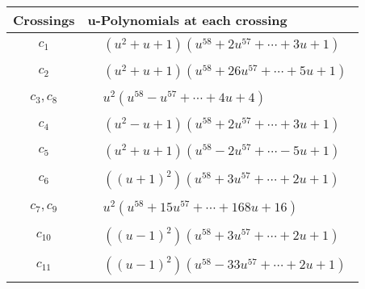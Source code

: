 \documentclass[1p]{elsarticle_modified}
\theoremstyle{definition}
\begin{document}
\begin{tabular}{m{50pt}|m{274pt}}
Crossings & \hspace{64pt}u-Polynomials at each crossing \\
\hline $$\begin{aligned}c_{1}\end{aligned}$$&$\begin{aligned}
&(u^2+u+1)(u^{58}+2 u^{57}+\cdots+3 u+1)
\end{aligned}$\\
\hline $$\begin{aligned}c_{2}\end{aligned}$$&$\begin{aligned}
&(u^2+u+1)(u^{58}+26 u^{57}+\cdots+5 u+1)
\end{aligned}$\\
\hline $$\begin{aligned}c_{3},c_{8}\end{aligned}$$&$\begin{aligned}
&u^2(u^{58}- u^{57}+\cdots+4 u+4)
\end{aligned}$\\
\hline $$\begin{aligned}c_{4}\end{aligned}$$&$\begin{aligned}
&(u^2- u+1)(u^{58}+2 u^{57}+\cdots+3 u+1)
\end{aligned}$\\
\hline $$\begin{aligned}c_{5}\end{aligned}$$&$\begin{aligned}
&(u^2+u+1)(u^{58}-2 u^{57}+\cdots-5 u+1)
\end{aligned}$\\
\hline $$\begin{aligned}c_{6}\end{aligned}$$&$\begin{aligned}
&((u+1)^2)(u^{58}+3 u^{57}+\cdots+2 u+1)
\end{aligned}$\\
\hline $$\begin{aligned}c_{7},c_{9}\end{aligned}$$&$\begin{aligned}
&u^2(u^{58}+15 u^{57}+\cdots+168 u+16)
\end{aligned}$\\
\hline $$\begin{aligned}c_{10}\end{aligned}$$&$\begin{aligned}
&((u-1)^2)(u^{58}+3 u^{57}+\cdots+2 u+1)
\end{aligned}$\\
\hline $$\begin{aligned}c_{11}\end{aligned}$$&$\begin{aligned}
&((u-1)^2)(u^{58}-33 u^{57}+\cdots+2 u+1)
\end{aligned}$\\
\hline
\end{tabular}\newpage\renewcommand{\arraystretch}{1}
\end{document}
